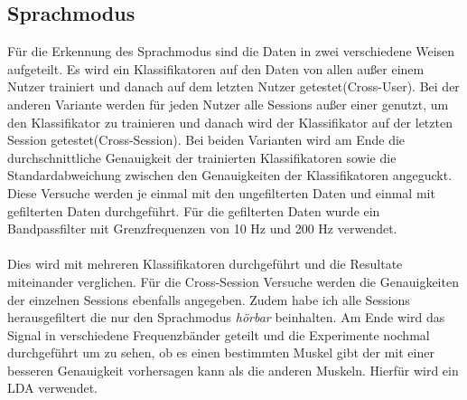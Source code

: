 \subsection{Sprachmodus}
Für die Erkennung des Sprachmodus sind die Daten in zwei verschiedene Weisen aufgeteilt.
Es wird ein Klassifikatoren auf den Daten von allen außer einem Nutzer trainiert und danach auf dem letzten Nutzer getestet(Cross-User).
Bei der anderen Variante werden für jeden Nutzer alle Sessions außer einer genutzt, um den Klassifikator zu trainieren und danach wird der Klassifikator auf der letzten Session  getestet(Cross-Session). 
Bei beiden Varianten wird am Ende die durchschnittliche Genauigkeit der trainierten Klassifikatoren sowie die Standardabweichung zwischen den Genauigkeiten der Klassifikatoren angeguckt. Diese Versuche werden je einmal mit den ungefilterten Daten und einmal mit gefilterten Daten durchgeführt. Für die gefilterten Daten wurde ein Bandpassfilter mit Grenzfrequenzen von 10 Hz und 200 Hz verwendet. 

\paragraph{}
Dies wird mit mehreren Klassifikatoren durchgeführt und die Resultate miteinander verglichen. Für die Cross-Session Versuche werden die Genauigkeiten der einzelnen Sessions ebenfalls angegeben.
Zudem habe ich alle Sessions herausgefiltert die nur den Sprachmodus \textit{hörbar} beinhalten.  Am Ende wird das Signal in verschiedene Frequenzbänder geteilt und die Experimente nochmal durchgeführt um zu sehen, ob es einen bestimmten Muskel gibt der mit einer besseren Genauigkeit vorhersagen kann als die anderen Muskeln. Hierfür wird ein LDA verwendet.
